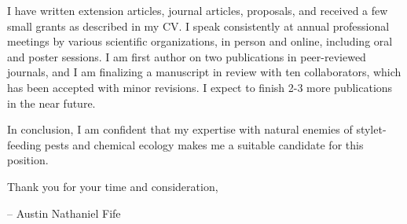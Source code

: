 \documentclass[11pt]{letter} %
\begin{document}
\begin{letter}
I have written extension articles, journal articles, proposals, and received a few small grants as described in my CV. I speak consistently at annual professional meetings by various scientific organizations, in person and online, including oral and poster sessions. I am first author on two publications in peer-reviewed journals, and I am finalizing a manuscript in review with ten collaborators, which has been accepted with minor revisions. I expect to finish 2-3 more publications in the near future.

In conclusion, I am confident that my expertise with natural enemies of stylet-feeding pests and chemical ecology makes me a suitable candidate for this position.

Thank you for your time and consideration,

\quad -- Austin Nathaniel Fife

\thispagestyle{empty}

\end{letter}
\end{document}
